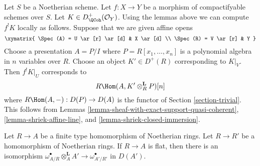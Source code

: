 \begin{remark}
\label{remark-local-calculation-shriek}
Let $S$ be a Noetherian scheme. Let $f : X \to Y$ be a morphism of
compactifyable schemes over $S$. Let $K \in D_\QCoh^+(\mathcal{O}_Y)$.
Using the lemmas above we can compute $f^!K$ locally as follows.
Suppose that we are given affine opens
$$
\xymatrix{
\Spec(A) = U \ar[r] \ar[d] & X \ar[d] \\
\Spec(R) = V \ar[r] & Y
}
$$
Choose a presentation $A = P/I$ where $P = R[x_1, \ldots, x_n]$
is a polynomial algebra in $n$ variables over $R$. Choose an
object $K' \in D^+(R)$ corresponding to $K|_V$. Then $f^!K|_U$
corresponds to
$$
R\Hom(A, K' \otimes_R^\mathbf{L} P)[n]
$$
where $R\Hom(A, -) : D(P) \to D(A)$ is the functor of
Section \ref{section-trivial}.
This follows from Lemmas \ref{lemma-sheaf-with-exact-support-quasi-coherent},
\ref{lemma-shriek-affine-line}, and
\ref{lemma-shriek-closed-immersion}.
\end{remark}

\begin{lemma}
\label{lemma-base-change-relative-algebraic}
Let $R \to A$ be a finite type homomorphism of Noetherian rings.
Let $R \to R'$ be a homomorphism of Noetherian rings.
If $R \to A$ is flat, then there is an isomorphism
$\omega_{A/R}^\bullet \otimes_A^\mathbf{L} A' \to \omega^\bullet_{A'/R'}$
in $D(A')$.
\end{lemma}

